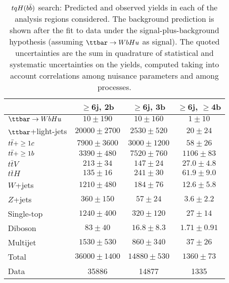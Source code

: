 \begin{table}[htbp]
\begin{center}
\begin{tabular}{l*{3}{c}}
\hline\hline
 & $\geq$6j, 2b & $\geq$6j, 3b & $\geq$6j, $\geq$4b \\
\hline
$\Hu$ &   $ 10 \pm 190 $ &   $ 10 \pm 160 $ &   $ 1 \pm 10 $ \\ 
\hline
$\ttbar$+light-jets  &   $ 20000 \pm 2700 $ &   $ 2530 \pm 520 $ &   $ 20 \pm 24 $ \\ 
$t\bar{t}+\geq1c$  &   $ 7900 \pm 3600 $ &   $ 3000 \pm 1200 $ &   $ 58 \pm 26 $ \\ 
$t\bar{t}+\geq1b$  &   $ 3390 \pm 480 $ &   $ 7520 \pm 760 $ &   $ 1106 \pm 83 $ \\ 
$t\bar{t}V$  &   $ 213 \pm 34 $ &   $ 147 \pm 24 $ &   $ 27.0 \pm 4.8 $ \\ 
$t\bar{t}H$  &   $ 135 \pm 16 $ &   $ 241 \pm 30 $ &   $ 61.9 \pm 9.0 $ \\ 
$W$+jets  &   $ 1210 \pm 480 $ &   $ 184 \pm 76 $ &   $ 12.6 \pm 5.8 $ \\ 
$Z$+jets  &   $ 360 \pm 150 $ &   $ 57 \pm 24 $ &   $ 3.6 \pm 2.2 $ \\ 
Single-top  &   $ 1240 \pm 400 $ &   $ 320 \pm 120 $ &   $ 27 \pm 14 $ \\ 
Diboson  &   $ 83 \pm 40 $ &   $ 16.8 \pm 8.3 $ &   $ 1.71 \pm 0.91 $ \\ 
Multijet  &   $ 1530 \pm 530 $ &   $ 860 \pm 340 $ &   $ 37 \pm 26 $ \\ 
\hline
Total &   $ 36000 \pm 1400 $ &   $ 14880 \pm 530 $ &   $ 1360 \pm 73 $ \\ 
\hline
Data & 35886  & 14877  & 1335  \\
\hline\hline      
\end{tabular}

%
\end{center}
\caption{
$tqH(b\bar{b})$ search: Predicted and observed yields in each of the analysis regions considered.
The background prediction is shown after the fit to data under the signal-plus-background hypothesis (assuming $\Hu$ as signal).
The quoted uncertainties are the sum in quadrature of statistical and systematic uncertainties on the yields, 
computed taking into account correlations among nuisance parameters and among processes.
}
\label{tab:Hbb_Postfit_Yields_Unblind_Hu}
\end{table}
